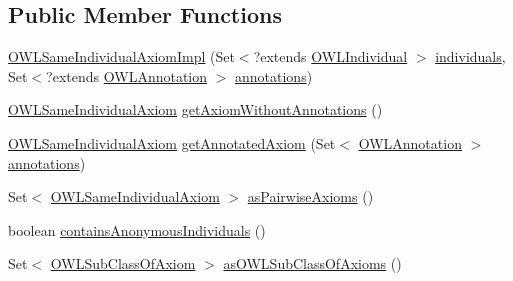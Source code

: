 \subsection*{Public Member Functions}
\begin{DoxyCompactItemize}
\item 
\hyperlink{classuk_1_1ac_1_1manchester_1_1cs_1_1owl_1_1owlapi_1_1_o_w_l_same_individual_axiom_impl_aa96ad97e26ef76cf4e1ad000cda16a98}{O\-W\-L\-Same\-Individual\-Axiom\-Impl} (Set$<$?extends \hyperlink{interfaceorg_1_1semanticweb_1_1owlapi_1_1model_1_1_o_w_l_individual}{O\-W\-L\-Individual} $>$ \hyperlink{classuk_1_1ac_1_1manchester_1_1cs_1_1owl_1_1owlapi_1_1_o_w_l_nary_individual_axiom_impl_aa2ee45265a7a0c1f5cc9260ac97ac071}{individuals}, Set$<$?extends \hyperlink{interfaceorg_1_1semanticweb_1_1owlapi_1_1model_1_1_o_w_l_annotation}{O\-W\-L\-Annotation} $>$ \hyperlink{classuk_1_1ac_1_1manchester_1_1cs_1_1owl_1_1owlapi_1_1_o_w_l_axiom_impl_af6fbf6188f7bdcdc6bef5766feed695e}{annotations})
\item 
\hyperlink{interfaceorg_1_1semanticweb_1_1owlapi_1_1model_1_1_o_w_l_same_individual_axiom}{O\-W\-L\-Same\-Individual\-Axiom} \hyperlink{classuk_1_1ac_1_1manchester_1_1cs_1_1owl_1_1owlapi_1_1_o_w_l_same_individual_axiom_impl_a6fb7cd942c184d83c70e21f242ff7664}{get\-Axiom\-Without\-Annotations} ()
\item 
\hyperlink{interfaceorg_1_1semanticweb_1_1owlapi_1_1model_1_1_o_w_l_same_individual_axiom}{O\-W\-L\-Same\-Individual\-Axiom} \hyperlink{classuk_1_1ac_1_1manchester_1_1cs_1_1owl_1_1owlapi_1_1_o_w_l_same_individual_axiom_impl_a2a3b6105e998d8c42de037426b9ed43e}{get\-Annotated\-Axiom} (Set$<$ \hyperlink{interfaceorg_1_1semanticweb_1_1owlapi_1_1model_1_1_o_w_l_annotation}{O\-W\-L\-Annotation} $>$ \hyperlink{classuk_1_1ac_1_1manchester_1_1cs_1_1owl_1_1owlapi_1_1_o_w_l_axiom_impl_af6fbf6188f7bdcdc6bef5766feed695e}{annotations})
\item 
Set$<$ \hyperlink{interfaceorg_1_1semanticweb_1_1owlapi_1_1model_1_1_o_w_l_same_individual_axiom}{O\-W\-L\-Same\-Individual\-Axiom} $>$ \hyperlink{classuk_1_1ac_1_1manchester_1_1cs_1_1owl_1_1owlapi_1_1_o_w_l_same_individual_axiom_impl_a95535f41a89d3ffd519d1a8fda84c142}{as\-Pairwise\-Axioms} ()
\item 
boolean \hyperlink{classuk_1_1ac_1_1manchester_1_1cs_1_1owl_1_1owlapi_1_1_o_w_l_same_individual_axiom_impl_a834a007c94bb19697df213c8ea33bd95}{contains\-Anonymous\-Individuals} ()
\item 
Set$<$ \hyperlink{interfaceorg_1_1semanticweb_1_1owlapi_1_1model_1_1_o_w_l_sub_class_of_axiom}{O\-W\-L\-Sub\-Class\-Of\-Axiom} $>$ \hyperlink{classuk_1_1ac_1_1manchester_1_1cs_1_1owl_1_1owlapi_1_1_o_w_l_same_individual_axiom_impl_a92c7bd0ac2bd2bb2f42b5f8cbd61ba91}{as\-O\-W\-L\-Sub\-Class\-Of\-Axioms} ()

\end{DoxyCompactItemize}
